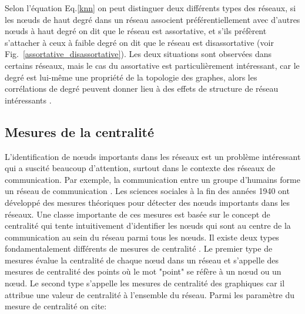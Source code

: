 Selon l'équation Eq.\ref{knn} on peut distinguer deux différents types des réseaux, si les nœuds de haut degré dans un réseau  associent préférentiellement avec d'autres nœuds à haut degré on dit que le réseau est assortative, et s'ils préfèrent  s'attacher à ceux à faible degré on dit que le réseau est disassortative (voir Fig.~\ref{assortative_disassortative}). Les deux situations sont observées dans certains réseaux, mais le cas du  assortative est particulièrement intéressant, car le degré est lui-même une propriété de la topologie des graphes, alors les corrélations de degré peuvent donner lieu à des effets de structure de réseau intéressants \cite{MS2002,Ne2003}. 

\subsection{Mesures de la centralité}

L'identification de nœuds importants dans les réseaux est un problème intéressant qui a suscité beaucoup d'attention, surtout dans le contexte des réseaux de communication. Par exemple, la communication entre un groupe d'humains forme un réseau de communication \cite{Dehmer2011}. Les sciences sociales à la fin des années 1940 ont développé des mesures théoriques pour détecter des nœuds importants dans les réseaux. Une classe importante de ces mesures est basée sur le concept de centralité \cite{Hage-Harary1995,Wasserman-Faust1994} qui tente intuitivement d'identifier les nœuds qui sont au centre de la communication au sein du réseau parmi tous les nœuds. Il existe deux types fondamentalement différents de mesures de centralité \cite{Freeman1977}. Le premier type de mesures évalue la centralité de chaque nœud dans un réseau et s'appelle des mesures de centralité des points où le mot "point" se réfère à un nœud ou un nœud. Le second type s'appelle les mesures de centralité des graphiques car il attribue une valeur de centralité à l'ensemble du réseau. Parmi les paramètre du mesure de centralité on cite:\\

